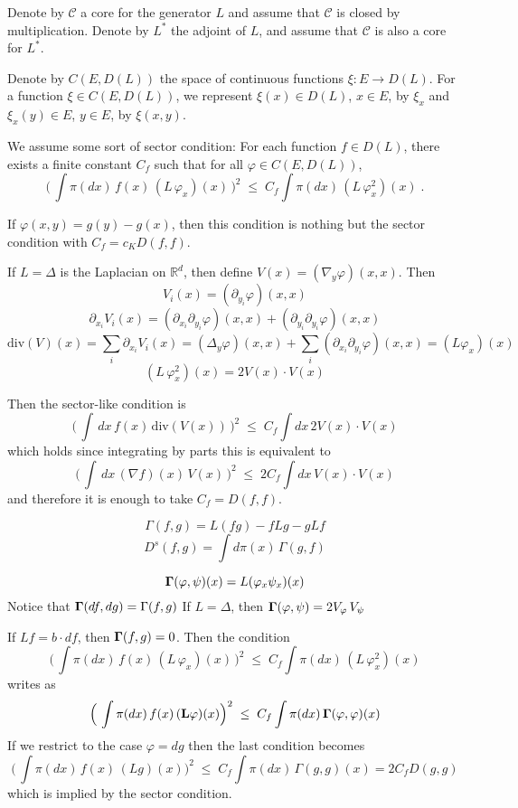 \documentclass[reqno]{amsart}
\newcounter{as}[section]
\newcommand{\mc}[1]{{\mathcal #1}}
\newcommand{\bb}[1]{{\mathbb #1}}
\newcommand{\<}{\langle}
\renewcommand{\>}{\rangle}
\newcommand{\comment}[1]{
	\par\noindent
	\colorbox{light}{\begin{minipage}{120 mm}#1\end{minipage}}
	\par\noindent
}
\begin{document}
Denote by $\mc C$ a core for the generator $L$ and assume that $\mc C$
is closed by multiplication. Denote by $L^\ast$ the adjoint of $L$, and
assume that $\mc C$ is also a core for $L^\ast$.

Denote by $C(E, D(L))$ the space of continuous functions $\xi \colon E \to
D(L)$. For a function $\xi \in C(E, D(L))$, we represent $\xi(x) \in
D(L)$, $x\in E$, by $\xi_x$ and $\xi_x(y) \in E$, $y\in E$, by
$\xi(x,y)$. 

We assume some sort of sector condition: For each function $f \in
  D(L)$, there exists a finite constant $C_f$ such that for all $\varphi
  \in C(E, D(L))$,
\begin{equation}
\label{03}
\Big(\, \int \pi(dx)\, f(x)\, ( L\, \varphi_x)(x) \, \Big)^2 \;\le\;
C_f \int \pi(dx)\, (L\, \varphi^2_x)(x)\;.
\end{equation}
\newpage


If $\varphi(x,y)= g(y)-g(x)$, then this condition is nothing but the sector condition with $C_f= c_K D(f,f)$.

If $L=\Delta$ is the Laplacian on $\bb R^d$, then define $V(x)=(\nabla_y \varphi)(x,x)$. Then 
$$ V_i(x)= (\partial_{y_i}\varphi)(x,x)$$
$$\partial_{x_i} V_i(x)= (\partial_{x_i} \partial_{y_i}\varphi)(x,x)+(\partial_{y_i} \partial_{y_i} \varphi)(x,x)$$
$$\mathrm{div}(V)(x)=
\sum_{i} \partial_{x_i} V_i(x)= (\Delta_y\varphi)(x,x)+ \sum_i (\partial_{x_i} \partial_{y_i}\varphi)(x,x)
= (L\varphi_x)(x)
$$
$$(L\, \varphi^2_x)(x)= 2 V(x) \cdot V(x)$$

Then the sector-like condition is 
$$\Big(\, \int\, dx\, f(x)\, \mathrm{div}(V(x)) \, \Big)^2 \;\le\;
C_f \int dx\, 2 V(x)\cdot V(x) 
$$
which holds since integrating by parts this is equivalent to
$$\Big(\, \int\, dx\, (\nabla f)(x)\, V(x) \, \Big)^2 \;\le\;
2 C_f \int dx\,  V(x)\cdot V(x) 
$$
and therefore it is enough to take $C_f=D(f,f)$.
\bigskip

$$ \Gamma(f,g)= L(f g)- f Lg -g Lf$$
$$D^s(f,g)=\int d\pi(x)\,\Gamma(g,f)$$

$${\bf \Gamma}(\varphi, \psi)(x)=L(\varphi_x \psi_x)(x)$$
Notice that ${\bf \Gamma}(df,dg)=\Gamma(f,g)$
If $L=\Delta$, then ${\bf \Gamma}(\varphi, \psi)=2V_\varphi\,V_\psi$

If $Lf=b\cdot df$, then ${\bf \Gamma}(f,g)=0$. Then
the condition 
$$\Big(\, \int \pi(dx)\, f(x)\, ( L\, \varphi_x)(x) \, \Big)^2 \;\le\;
C_f \int \pi(dx)\, (L\, \varphi^2_x)(x)$$
writes as 
$$\Big(\, \int \pi(dx)\, f(x)\, ({\bf L} \varphi)(x) \Big)^2 \;\le\;
C_f \int \pi(dx)\, {\bf \Gamma}(\varphi,\varphi)(x)$$
If we restrict to the case $\varphi=dg$ then the last condition becomes
$$\Big(\, \int \pi(dx)\, f(x)\,  (Lg)(x) \Big)^2 \;\le\;
C_f \int \pi(dx)\, \Gamma(g,g)(x)=2 C_f D(g,g) $$
which is implied by the sector condition.
\end{document}
